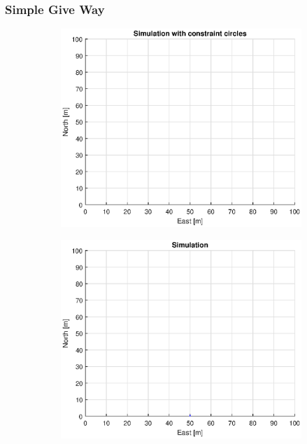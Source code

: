 \subsubsection{Simple Give Way}
\clearpage
\begin{figure}[!b] %
    \begin{subfigure}[b]{0.49\textwidth}
        \centering
        \includegraphics[width=\textwidth]{Images/Figures/Enkel_GW/Simple0_f1_Frame1}
    \end{subfigure}
    \hfill
    \begin{subfigure}[b]{0.499\textwidth}
        \centering
        \includegraphics[width=\textwidth]{Images/Figures/Enkel_GW/Simple0_f600_Frame1}

\end{subfigure}
\end{figure}
